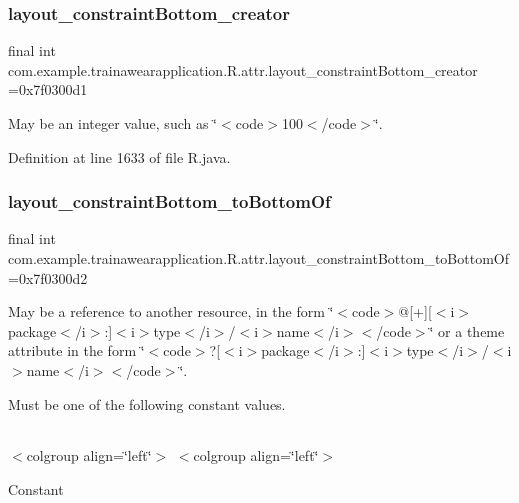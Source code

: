 \subsubsection{\texorpdfstring{layout\_constraintBottom\_creator}{layout\_constraintBottom\_creator}}
{\footnotesize\ttfamily final int com.\+example.\+trainawearapplication.\+R.\+attr.\+layout\+\_\+constraint\+Bottom\+\_\+creator =0x7f0300d1\hspace{0.3cm}{\ttfamily [static]}}

May be an integer value, such as \char`\"{}$<$code$>$100$<$/code$>$\char`\"{}. 

Definition at line 1633 of file R.\+java.

\mbox{\label{classcom_1_1example_1_1trainawearapplication_1_1_r_1_1attr_a29b03d28b0999b2dfa6c564767b0dd70}} 
\subsubsection{\texorpdfstring{layout\_constraintBottom\_toBottomOf}{layout\_constraintBottom\_toBottomOf}}
{\footnotesize\ttfamily final int com.\+example.\+trainawearapplication.\+R.\+attr.\+layout\+\_\+constraint\+Bottom\+\_\+to\+Bottom\+Of =0x7f0300d2\hspace{0.3cm}{\ttfamily [static]}}

May be a reference to another resource, in the form \char`\"{}$<$code$>$@\mbox{[}+\mbox{]}\mbox{[}$<$i$>$package$<$/i$>$\+:\mbox{]}$<$i$>$type$<$/i$>$/$<$i$>$name$<$/i$>$$<$/code$>$\char`\"{} or a theme attribute in the form \char`\"{}$<$code$>$?\mbox{[}$<$i$>$package$<$/i$>$\+:\mbox{]}$<$i$>$type$<$/i$>$/$<$i$>$name$<$/i$>$$<$/code$>$\char`\"{}. 

Must be one of the following constant values.

\tabulinesep=1mm
\begin{longtabu}spread 0pt [c]{*{0}{|X[-1]}|}
\hline
\end{longtabu}
$<$colgroup align=\char`\"{}left\char`\"{}$>$ $<$colgroup align=\char`\"{}left\char`\"{}$>$ 

Constant

